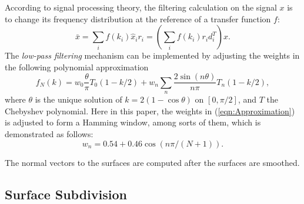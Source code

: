 According to signal processing theory, the filtering calculation on the signal $x$ is to change its frequency distribution at the reference of a transfer function $f$:
\begin{equation}
\bar{x} = \sum_{i} f(k_i) \hat{x}_i r_i = \left( \sum_{i} f(k_i) r_i d_i^T \right) x.
\end{equation}
The \emph{low-pass filtering} mechanism can be implemented by adjusting the weights in the following polynomial approximation
\begin{equation}
\label{eqn:Approximation}
f_{N}(k) = w_0 \frac{\theta}{\pi} T_0 (1 - k / 2) + w_n \sum_{n} \frac{2 \sin (n \theta)}{n \pi} T_n(1 - k / 2),
\end{equation}
where $\theta$ is the unique solution of $k = 2 (1 - \cos \theta)$ on $[0, \pi / 2]$, and $T$ the Chebyshev polynomial.
Here in this paper, the weights in (\ref{eqn:Approximation}) is adjusted to form a Hamming window, among sorts of them, which is demonstrated as follows:
\begin{equation}
\label{eqn:HammingWindow}
w_n = 0.54 + 0.46 \cos (n \pi / (N + 1) ).
\end{equation}

The normal vectors to the surfaces are computed after the surfaces are smoothed.

\subsection{Surface Subdivision}

